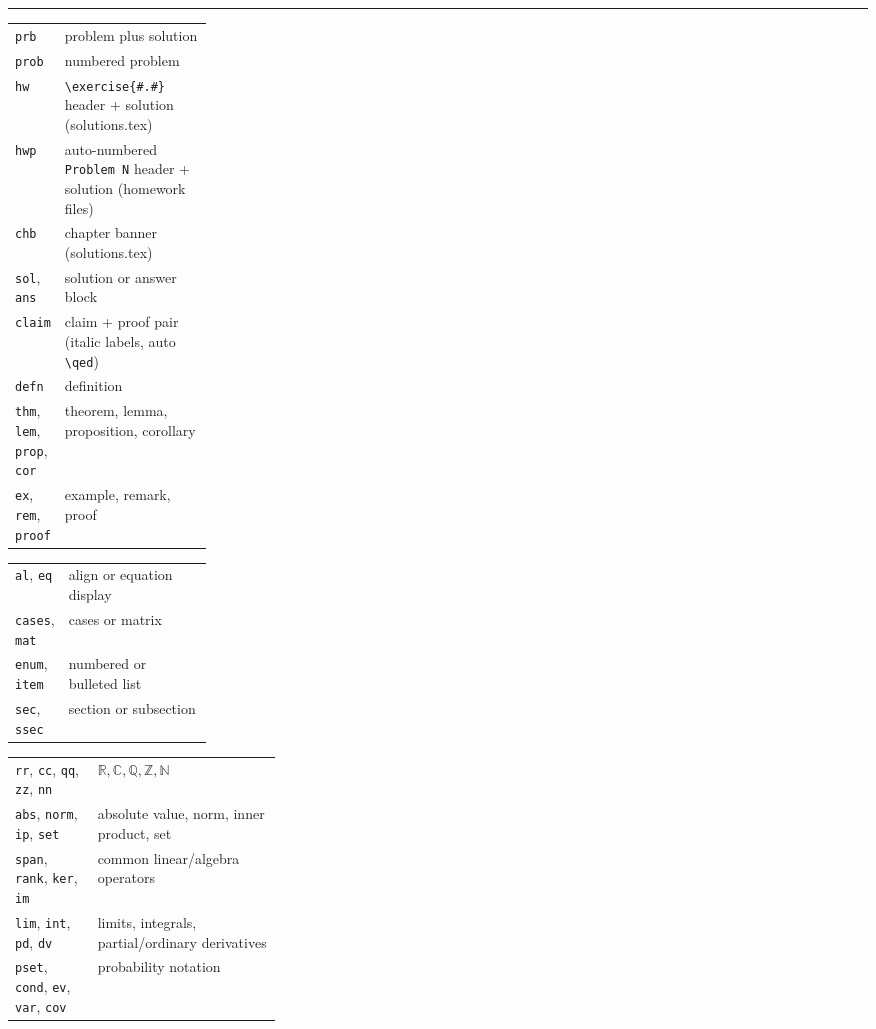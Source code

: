 \documentclass[10pt]{article}
\newcommand{\cmd}[1]{\texttt{#1}}
\newcommand{\sectiontitle}[1]{\vspace{0.35em}{\large\sffamily\bfseries\textcolor{navy}{#1}}\par\vspace{-0.2em}\textcolor{rule}{\rule{\linewidth}{0.6pt}}}
\newcommand{\smalltitle}[1]{\vspace{0.15em}{\sffamily\bfseries\textcolor{navy}{#1}}\par}
\begin{document}
\newpage
\begin{multicols}{2}

\sectiontitle{LuaSnip triggers already installed}
\smalltitle{Statements and proof structure}
\begin{tabularx}{\linewidth}{@{}>{\ttfamily}p{0.23\linewidth}X@{}}
\cmd{prb} & problem plus solution\\
\cmd{prob} & numbered problem\\
\cmd{hw} & \cmd{\textbackslash exercise\{\#.\#\}} header + solution (solutions.tex)\\
\cmd{hwp} & auto-numbered \cmd{Problem N} header + solution (homework files)\\
\cmd{chb} & chapter banner (solutions.tex)\\
\cmd{sol}, \cmd{ans} & solution or answer block\\
\cmd{claim} & claim + proof pair (italic labels, auto \cmd{\textbackslash qed})\\
\cmd{defn} & definition\\
\cmd{thm}, \cmd{lem}, \cmd{prop}, \cmd{cor} & theorem, lemma, proposition, corollary\\
\cmd{ex}, \cmd{rem}, \cmd{proof} & example, remark, proof\\
\end{tabularx}

\smalltitle{Display and layout}
\begin{tabularx}{\linewidth}{@{}>{\ttfamily}p{0.23\linewidth}X@{}}
\cmd{al}, \cmd{eq} & align or equation display\\
\cmd{cases}, \cmd{mat} & cases or matrix\\
\cmd{enum}, \cmd{item} & numbered or bulleted list\\
\cmd{sec}, \cmd{ssec} & section or subsection\\
\end{tabularx}

\smalltitle{Mathematical shorthand}
\begin{tabularx}{\linewidth}{@{}>{\ttfamily}p{0.31\linewidth}X@{}}
\cmd{rr}, \cmd{cc}, \cmd{qq}, \cmd{zz}, \cmd{nn} & \(\mathbb{R},\mathbb{C},\mathbb{Q},\mathbb{Z},\mathbb{N}\)\\
\cmd{abs}, \cmd{norm}, \cmd{ip}, \cmd{set} & absolute value, norm, inner product, set\\
\cmd{span}, \cmd{rank}, \cmd{ker}, \cmd{im} & common linear/algebra operators\\
\cmd{lim}, \cmd{int}, \cmd{pd}, \cmd{dv} & limits, integrals, partial/ordinary derivatives\\
\cmd{pset}, \cmd{cond}, \cmd{ev}, \cmd{var}, \cmd{cov} & probability notation\\
\end{tabularx}


\end{multicols}
\end{document}
